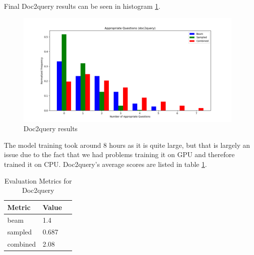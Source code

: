 \documentclass[fleqn,moreauthors,10pt]{ds_report}
\begin{document}
Final Doc2query results can be seen in histogram \ref{fig:h1}.
\begin{figure}[htp!]
    \centering
    \includegraphics[width=1\columnwidth]{doc2query_combined_histogram.png}
    \caption{Doc2query results}
    \label{fig:h1}
\end{figure}
The model training took around 8 hours as it is quite large, but that is largely an issue due to the fact that we had problems training it on GPU and therefore trained it on CPU. Doc2query's average scores are listed in table \ref{tab:doc2query}.
\begin{table}[h!]
\centering
\begin{tabular}{@{}lll@{}}
\toprule
\textbf{Metric} & \textbf{Value} \\ \midrule
beam & 1.4  \\
sampled & 0.687 \\
combined & 2.08  \\ \bottomrule
\end{tabular}
\caption{Evaluation Metrics for Doc2query}
\label{tab:doc2query}
\end{table}
\end{document}
